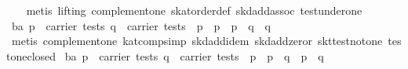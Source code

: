 \begin{isabellebody}
%
\isadelimproof
\ \ %
\endisadelimproof
%
\isatagproof
{}\isamarkupfalse%
\ {}metis\ {}lifting{}\ complement{}one\ skat{}order{}def\ skd{}add{}assoc\ test{}under{}one{}%
\endisatagproof
{\isafoldproof}%
%
\isadelimproof
\isanewline
%
\endisadelimproof
\isanewline
{}\isamarkupfalse%
\ ba{}{}{}\ {}{}p\ {}\ carrier\ tests{}\ q\ {}\ carrier\ tests{}\ {}\ p\ {}\ p\ {}\ p\ {}\ {}{}q\ {}\ {}q{}{}\isanewline
%
\isadelimproof
\ \ %
\endisadelimproof
%
\isatagproof
{}\isamarkupfalse%
\ {}metis\ complement{}one\ kat{}comp{}simp\ skd{}add{}idem\ skd{}add{}zeror\ skt{}test{}not{}one\ test{}one{}closed{}%
\endisatagproof
{\isafoldproof}%
%
\isadelimproof
\isanewline
%
\endisadelimproof
\isanewline
{}\isamarkupfalse%
\ ba{}{}{}\ {}{}p\ {}\ carrier\ tests{}\ q\ {}\ carrier\ tests{}\ {}\ p\ {}\ {}p\ {}\ {}q{}\ {}\ {}p\ {}\ q{}{}\isanewline

\end{isabellebody}

